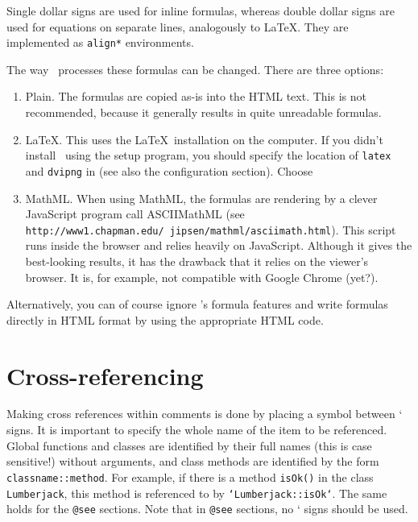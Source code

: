 Single dollar signs are used for inline formulas, whereas double dollar signs
are used for equations on separate lines, analogously to \LaTeX.  They 
are implemented as {\tt align*} environments.

The way \oxdoc~processes these formulas can be changed.  There are three options:
\begin{enumerate}
\item Plain.  The formulas are copied as-is into the HTML text.  This is not
recommended, because it generally results in quite unreadable formulas.

\item \LaTeX.  This uses the \LaTeX~installation on the computer. If you
didn't install \oxdoc~using the setup program, you should specify the
location of {\tt latex} and {\tt dvipng} in \oxdocxml (see also the configuration
section). Choose


\item MathML.  When using MathML, the formulas are rendering by a clever JavaScript
program call ASCIIMathML (see {\tt http://www1.chapman.edu/~jipsen/mathml/asciimath.html}). 
This script runs inside the browser and relies heavily on JavaScript. Although it gives
the best-looking results, it has the drawback that it relies on the viewer's browser.
It is, for example, not compatible with Google Chrome (yet?).
\end{enumerate}

Alternatively, you can of course ignore \oxdoc's formula features and write
formulas directly in HTML format by using the appropriate HTML code.

\section{Cross-referencing}
Making cross references within comments is done by placing a symbol between ` signs.  It is important to
specify the whole name of the item to be referenced.  Global functions and classes are identified by
their full names (this is case sensitive!) without arguments, and class methods are identified by the
form {\tt classname::method}. For example, if there is a method {\tt isOk()} in the class {\tt Lumberjack},
this method is referenced to by {\tt `Lumberjack::isOk`}.  The same holds for the {\tt @see} sections.
Note that in {\tt @see} sections, no ` signs should be used.


